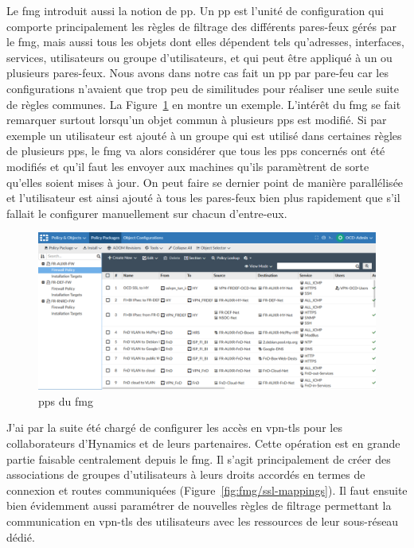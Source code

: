 \documentclass[12pt, oneside, a4paper, titlepage]{report}
\begin{document}
Le \acrlong{fmg} introduit aussi la notion de \gls{pp}. Un \gls{pp} est l'unité
de configuration qui comporte principalement les règles de filtrage des
différents pares-feux gérés par le \gls{fmg}, mais aussi tous les objets dont
elles dépendent tels qu'adresses, interfaces, services, utilisateurs ou groupe
d'utilisateurs, et qui peut être appliqué à un ou plusieurs pares-feux. Nous
avons dans notre cas fait un \gls{pp} par pare-feu car les configurations
n'avaient que trop peu de similitudes pour réaliser une seule suite de règles
communes. La Figure~\ref{fig:fmg/policy-packages} en montre un exemple.
L'intérêt du \acrlong{fmg} se fait remarquer surtout lorsqu'un objet commun à
plusieurs \glspl{pp} est modifié. Si par exemple un utilisateur est ajouté à un
groupe qui est utilisé dans certaines règles de plusieurs \glspl{pp}, le
\acrlong{fmg} va alors considérer que tous les \glspl{pp} concernés ont été
modifiés et qu'il faut les envoyer aux machines qu'ils paramètrent de sorte
qu'elles soient mises à jour. On peut faire se dernier point de manière
parallélisée et l'utilisateur est ainsi ajouté à tous les pares-feux bien plus
rapidement que s'il fallait le configurer manuellement sur chacun d'entre-eux.

\begin{figure}[h!]
    \centering
    \includegraphics[width = \linewidth]{img/fmg/policy-packages.png}
    \caption{\Glspl{pp} du \acrlong{fmg}}%
    \label{fig:fmg/policy-packages}
\end{figure}
\FloatBarrier{}

J'ai par la suite été chargé de configurer les accès en \gls{vpn-tls} pour les
collaborateurs d'Hynamics et de leurs partenaires. Cette opération est en grande
partie faisable centralement depuis le \acrlong{fmg}. Il s'agit principalement
de créer des associations de groupes d'utilisateurs à leurs droits accordés en
termes de connexion et routes communiquées (Figure~\ref{fig:fmg/ssl-mappings}).
Il faut ensuite bien évidemment aussi paramétrer de nouvelles règles de filtrage
permettant la communication en \gls{vpn-tls} des utilisateurs avec les
ressources de leur sous-réseau dédié.
\end{document}
